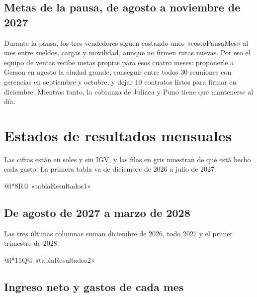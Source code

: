 \documentclass[10.5pt,a4paper]{article}
\begin{document}
\subsection{Metas de la pausa, de agosto a noviembre de 2027}

Durante la pausa, los tres vendedores siguen costando unos «costoPausaMes» al mes entre sueldos, cargas y movilidad, aunque no firmen rutas nuevas. Por eso el equipo de ventas recibe metas propias para esos cuatro meses: proponerle a Gerson en agosto la ciudad grande, conseguir entre todos 30 reuniones con gerencias en septiembre y octubre, y dejar 10 contratos listos para firmar en diciembre. Mientras tanto, la cobranza de Juliaca y Puno tiene que mantenerse al día.

\newpage
\section{Estados de resultados mensuales}

Las cifras están en soles y sin IGV, y las filas en gris muestran de qué está hecho cada gasto. La primera tabla va de diciembre de 2026 a julio de 2027.

{\scriptsize\setlength{\tabcolsep}{2.6pt}\renewcommand{\arraystretch}{0.95}
\begin{tabular}{@{}l*{8}{R}@{}}
\toprule
«tablaResultados1»
\bottomrule
\end{tabular}}

\newpage
\subsection{De agosto de 2027 a marzo de 2028}

Las tres últimas columnas suman diciembre de 2026, todo 2027 y el primer trimestre de 2028.

{\scriptsize\setlength{\tabcolsep}{2.2pt}\renewcommand{\arraystretch}{0.95}
\begin{tabular}{@{}l*{11}{Q}@{}}
\toprule
«tablaResultados2»
\bottomrule
\end{tabular}}

\newpage
\subsection{Ingreso neto y gastos de cada mes}
\end{document}
